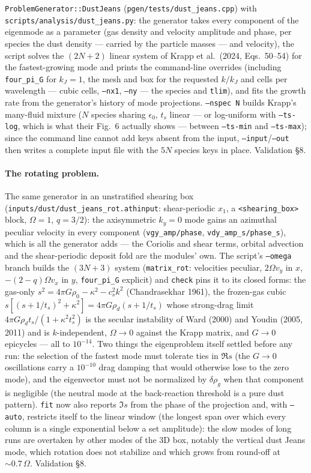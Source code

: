 \documentclass[11pt]{article}
\newcommand{\code}[1]{\texttt{#1}}
\newcommand{\file}[1]{\texttt{\small #1}}
\newcommand{\fn}[1]{\texttt{\small #1}}
\begin{document}
\fn{ProblemGenerator::DustJeans} (\file{pgen/tests/dust\_jeans.cpp}) with
\file{scripts/analysis/dust\_jeans.py}: the generator takes every component of the
eigenmode as a parameter (gas density and velocity amplitude and phase, per species the
dust density --- carried by the particle masses --- and velocity), the script solves the
$(2N+2)$ linear system of Krapp et al.\ (2024, Eqs.\ 50--54) for the fastest-growing
mode and prints the command-line overrides (including \code{four\_pi\_G} for
$k_J = 1$, the mesh and box for the requested $k/k_J$ and cells per wavelength ---
cubic cells, \code{--nx1}, \code{--ny} --- the species and \code{tlim}), and fits
the growth rate from the generator's history of mode projections. \code{--nspec N}
builds Krapp's many-fluid mixture ($N$ species sharing $\epsilon_0$, $t_s$ linear ---
or log-uniform with \code{--ts-log}, which is what their Fig.\ 6 actually shows ---
between \code{--ts-min} and \code{--ts-max}); since the command line cannot add keys
absent from the input, \code{--input}/\code{--out} then writes a complete input file
with the $5N$ species keys in place. Validation \S8.

\paragraph{The rotating problem.} The same generator in an unstratified shearing box
(\file{inputs/dust/dust\_jeans\_rot.athinput}: shear-periodic $x_1$, a
\code{<shearing\_box>} block, $\Omega = 1$, $q = 3/2$): the axisymmetric $k_y = 0$
mode gains an azimuthal peculiar velocity in every component
(\code{vgy\_amp/phase}, \code{vdy\_amp\_s/phase\_s}), which is all the generator
adds --- the Coriolis and shear terms, orbital advection and the shear-periodic
deposit fold are the modules' own. The script's \code{--omega} branch builds the
$(3N+3)$ system (\fn{matrix\_rot}: velocities peculiar, $2\Omega v_y$ in $x$,
$-(2-q)\Omega v_x$ in $y$, \code{four\_pi\_G} explicit) and \code{check} pins it to
its closed forms: the gas-only $s^2 = 4\pi G\rho_0 - \kappa^2 - c_s^2k^2$
(Chandrasekhar 1961), the frozen-gas cubic $s[(s+1/t_s)^2 + \kappa^2] = 4\pi
G\rho_d(s + 1/t_s)$ whose strong-drag limit $4\pi G\rho_d t_s/(1 + \kappa^2 t_s^2)$
is the secular instability of Ward (2000) and Youdin (2005, 2011) and is
$k$-independent, $\Omega \to 0$ against the Krapp matrix, and $G \to 0$ epicycles ---
all to $10^{-14}$. Two things the eigenproblem itself settled before any run: the
selection of the fastest mode must tolerate ties in $\Re s$ (the $G \to 0$
oscillations carry a $10^{-10}$ drag damping that would otherwise lose to the zero
mode), and the eigenvector must not be normalized by $\delta\rho_g$ when that component
is negligible (the neutral mode at the back-reaction threshold is a pure dust pattern).
\code{fit} now also reports $\Im s$ from the phase of the projection and, with
\code{--auto}, restricts itself to the linear window (the longest span over which every
column is a single exponential below a set amplitude): the slow modes of long runs are
overtaken by other modes of the 3D box, notably the vertical dust Jeans mode, which
rotation does not stabilize and which grows from round-off at $\sim 0.7\,\Omega$.
Validation \S8.
\end{document}
